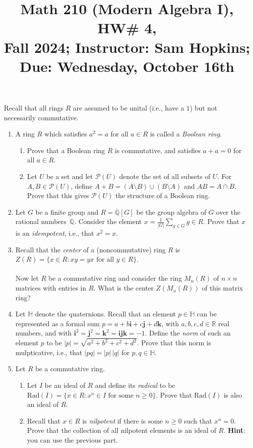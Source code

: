 \documentclass[11pt]{article}
\title{Math 210 (Modern Algebra I), HW\# 4, \\ {\normalsize Fall 2024; Instructor: Sam Hopkins; Due: Wednesday, October 16th}}
\date{}
\begin{document}
\maketitle

\thispagestyle{empty}

Recall that all rings $R$ are assumed to be unital (i.e., have a $1$) but not necessarily commutative.

\begin{enumerate}

\item A ring $R$ which satisfies $a^2 = a$ for all $a\in R$ is called a \emph{Boolean ring}. 
\begin{enumerate}
\item Prove that a Boolean ring $R$ is commutative, and satisfies $a+a=0$ for all $a\in R$.
\item Let $U$ be a set and let $\mathcal{P}(U)$ denote the set of all subsets of $U$. For $A,B \in \mathcal{P}(U)$, define $A+B = (A\setminus B) \cup (B\setminus A)$ and $AB = A\cap B$. Prove that this gives $\mathcal{P}(U)$ the structure of a Boolean ring.
\end{enumerate}

\item Let $G$ be a finite group and $R = \mathbb{Q}[G]$ be the group algebra of $G$ over the rational numbers~$\mathbb{Q}$. Consider the element $x = \displaystyle \frac{1}{|G|}\sum_{g \in G} g \in R$. Prove that $x$ is an \emph{idempotent}, i.e., that $x^2 = x$.

\item Recall that the \emph{center} of a (noncommutative) ring $R$ is $Z(R) = \{x \in R\colon xy = yx \textrm{ for all $y \in R$}\}$. \\
\\ Now let $R$ be a commutative ring and consider the ring $M_n(R)$ of $n\times n$ matrices with entries in $R$. What is the center $Z(M_n(R))$ of this matrix ring?

\item Let $\mathbb{H}$ denote the quaternions. Recall that an element $p\in \mathbb{H}$ can be represented as a formal sum $p=a + b\mathbf{i} + c\mathbf{j} + d\mathbf{k}$, with $a,b,c,d\in \mathbb{R}$ real numbers, and with $\mathbf{i}^2=\mathbf{j}^2=\mathbf{k}^2=\mathbf{ijk}=-1$. Define the \emph{norm} of such an element $p$ to be $|p| = \sqrt{a^2+b^2+c^2+d^2}$. Prove that this norm is mulpticative, i.e., that $| p q | = |p| \, |q|$ for $p,q \in \mathbb{H}$.

\item Let $R$ be a commutative ring.
\begin{enumerate}
\item Let $I$ be an ideal of $R$ and define its \emph{radical} to be $\mathrm{Rad}(I) = \{x \in R\colon x^n \in I \textrm{ for some $n \geq 0$}\}$. Prove that $\mathrm{Rad}(I)$ is also an ideal of $R$.
\item Recall that $x\in R$ is \emph{nilpotent} if there is some $n \geq 0$ such that $x^n=0$. Prove that the collection of all nilpotent elements is an ideal of $R$. {\bf Hint}: you can use the previous part.
\end{enumerate}



\end{enumerate}
\end{document}
